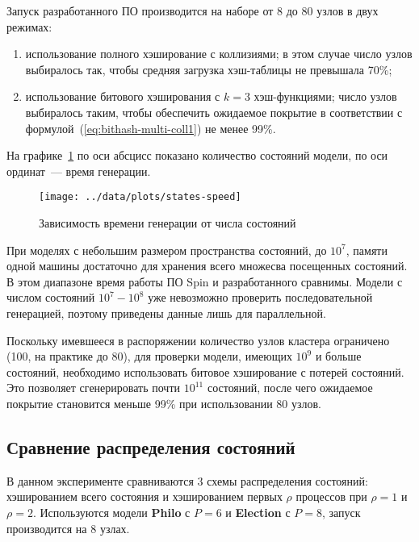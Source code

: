 \documentclass[12pt,a4paper,fleqn]{article}
\newcommand{\Code}[1]{\textbf{\mbox{#1}}}
\begin{document}
Запуск разработанного ПО производится на наборе от 8 до 80 узлов в двух режимах:
\begin{enumerate}
\item использование полного хэширование с коллизиями; в этом случае число узлов выбиралось
  так, чтобы средняя загрузка хэш-таблицы не превышала 70\%;
\item использование битового хэширования с $k = 3$ хэш-функциями; число узлов выбиралось таким,
  чтобы обеспечить ожидаемое покрытие в соответствии с формулой~(\ref{eq:bithash-multi-coll1}) не
  менее 99\%.
\end{enumerate}

На графике~\ref{fig:states-speed} по оси абсцисс показано количество состояний модели, по
оси ординат~--- время генерации.

\begin{figure}[ht]
  \centering
  \texttt{[image: ../data/plots/states-speed]}
  \caption{Зависимость времени генерации от числа состояний}
  \label{fig:states-speed}
\end{figure}

При моделях с небольшим размером пространства состояний, до $10^7$, памяти одной машины
достаточно для хранения всего множесва посещенных состояний. В этом диапазоне время работы
ПО Spin и разработанного сравнимы. Модели с числом состояний $10^7-10^8$ уже невозможно
проверить последовательной генерацией, поэтому приведены данные лишь для
параллельной. 

Поскольку имевшееся в распоряжении количество узлов кластера ограничено (100, на практике
до 80), для проверки модели, имеющих $10^9$ и больше состояний, необходимо использовать
битовое хэширование с потерей состояний. Это позволяет сгенерировать почти $10^{11}$
состояний, после чего ожидаемое покрытие становится меньше 99\% при использовании 80
узлов.

\subsection{Сравнение распределения состояний}

В данном эксперименте сравниваются 3 схемы распределения состояний: хэшированием всего состояния и
хэшированием первых $\rho$ процессов при $\rho = 1$ и $\rho = 2$. Используются модели \Code{Philo} с
$P = 6$ и \Code{Election} с $P = 8$, запуск производится на 8 узлах.
\end{document}
